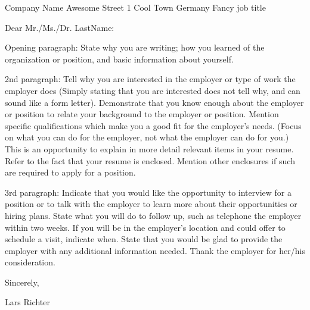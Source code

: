\begin{cvletter}
  \cvletterinfo
    {Company Name}
    {Awesome Street 1}
    {Cool Town}
    {Germany}
    {Fancy job title}
    
Dear Mr./Ms./Dr. LastName:

Opening paragraph: State why you are writing; how you learned of the organization or position, and basic information about yourself.

2nd paragraph: Tell why you are interested in the employer or type of work the employer does (Simply stating that you are interested does not tell why, and can sound like a form letter). Demonstrate that you know enough about the employer or position to relate your background to the employer or position. Mention specific qualifications which make you a good fit for the employer’s needs. (Focus on what you can do for the employer, not what the employer can do for you.) This is an opportunity to explain in more detail relevant items in your resume. Refer to the fact that your resume is enclosed. Mention other enclosures if such are required to apply for a position.

3rd paragraph: Indicate that you would like the opportunity to interview for a position or to talk with the employer to learn more about their opportunities or hiring plans. State what you will do to follow up, such as telephone the employer within two weeks. If you will be in the employer’s location and could offer to schedule a visit, indicate when. State that you would be glad to provide the employer with any additional information needed. Thank the employer for her/his consideration.

Sincerely,\newline

Lars Richter
\end{cvletter}
